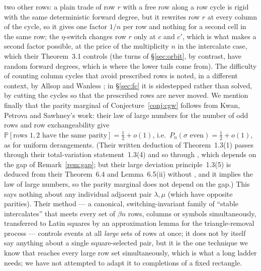 \documentclass[11pt]{article}
\theoremstyle{definition}
\renewcommand{\Pr}{\mathbb{P}}
\newcommand{\PP}{P}
\begin{document}
two other rows: a plain trade of row $r$ with a free row along a row cycle is rigid with the
same deterministic forward degree, but it rewrites row $r$ at every column of the cycle,
so it gives one factor $1/n$ per row and nothing for a second cell in the same row; the
$\eta$-switch changes row $r$ only at $c$ and $c'$, which is what makes a second factor
possible, at the price of the multiplicity $n$ in the intercalate case, which their
Theorem~3.1 controls (the turns of \S\ref{sec:orbit}, by contrast, have random forward
degrees, which is where the lower tails come from).  The difficulty of counting column
cycles that avoid prescribed rows is noted, in a different context, by Allsop and Wanless
\cite[\S3.1]{AW25}; in \S\ref{sec:fc} it is sidestepped rather than solved, by cutting the
cycles so that the prescribed rows are never moved.  We
mention finally that the parity marginal of Conjecture~\ref{conj:cgw} follows from Kwan,
Petrova and Sawhney's work: their law of large numbers for the number of odd rows
\cite[Thm.~1.3(1)]{KPS25} and row exchangeability give
$\Pr[\text{rows }1,2\text{ have the same parity}]=\tfrac12+o(1)$, i.e.\
$\PP_n(\sigma\text{ even})=\tfrac12+o(1)$, as for uniform derangements.  (Their written
deduction of Theorem~1.3(1) passes through their total-variation statement~1.3(4) and so
through \cite{CW16}, which depends on the gap of Remark~\ref{rem:gap}; but their large
deviation principle~1.3(5) is deduced from their Theorem~6.4 and Lemma~6.5(ii) without
\cite{CW16}, and it implies the law of large numbers, so the parity marginal does not
depend on the gap.)  This says nothing about any individual adjacent pair $\lambda,\mu$
(which have opposite parities).  Their method --- a canonical, switching-invariant family
of ``stable intercalates'' that meets every set of $\beta n$ rows, columns or symbols
simultaneously, transferred to Latin squares by an approximation lemma for the
triangle-removal process --- controls events at all \emph{large} sets of rows at once; it
does not by itself say anything about a single square-selected pair, but it is the one
technique we know that reaches every large row set simultaneously, which is what a long
ladder needs; we have not attempted to adapt it to completions of a fixed rectangle.
\end{document}
